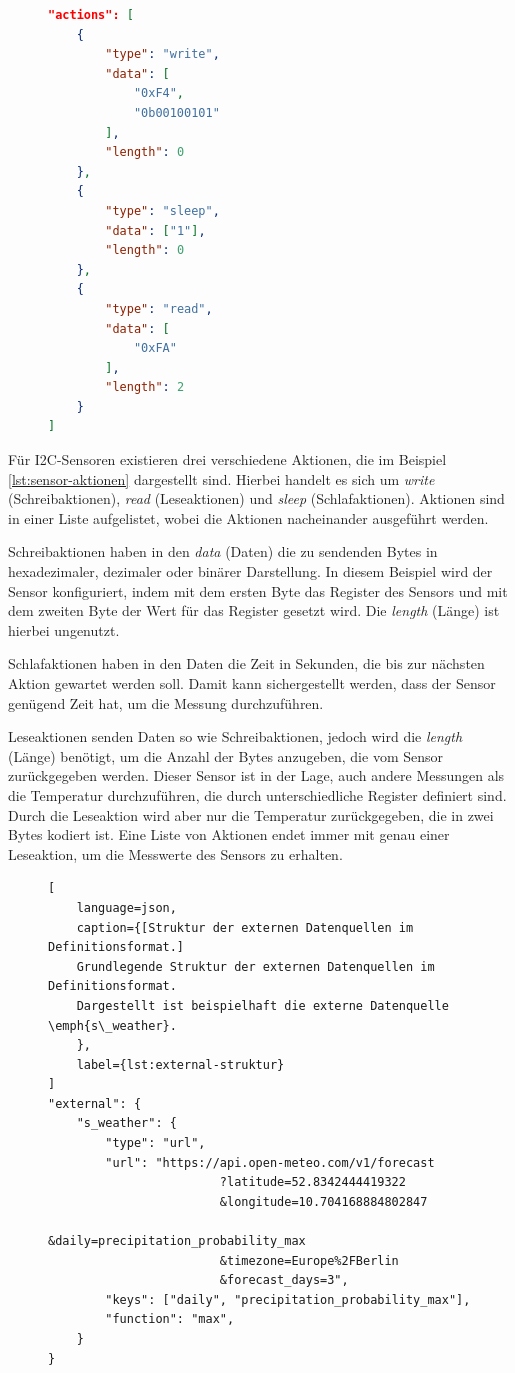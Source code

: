 \begin{figure}[!htb]
\begin{lstlisting}[language=json, caption={[Struktur der Aktionen von Sensoren des Typs I2C im Definitionsformat.]
	Grundlegende Struktur der Aktionen von Sensoren des Typs I2C im Definitionsformat.
	Dargestellt sind beispielhaft die Aktionen für den Sensor \emph{s\_temperature}.
	},
	label={lst:sensor-aktionen}
]
"actions": [
	{
		"type": "write",
		"data": [
			"0xF4",
			"0b00100101"
		],
		"length": 0
	},
	{
		"type": "sleep",
		"data": ["1"],
		"length": 0
	},
	{
		"type": "read",
		"data": [
			"0xFA"
		],
		"length": 2
	}
]
\end{lstlisting}
\end{figure}

Für I2C-Sensoren existieren drei verschiedene Aktionen, die im Beispiel \cref{lst:sensor-aktionen} dargestellt sind.
Hierbei handelt es sich um \emph{write} (Schreibaktionen), \emph{read} (Leseaktionen) und \emph{sleep} (Schlafaktionen).
Aktionen sind in einer Liste aufgelistet, wobei die Aktionen nacheinander ausgeführt werden.

Schreibaktionen haben in den \emph{data} (Daten) die zu sendenden Bytes in hexadezimaler, dezimaler oder binärer Darstellung.
In diesem Beispiel wird der Sensor konfiguriert, indem mit dem ersten Byte das Register des Sensors und mit dem zweiten Byte der Wert für das Register gesetzt wird.
Die \emph{length} (Länge) ist hierbei ungenutzt.

Schlafaktionen haben in den Daten die Zeit in Sekunden, die bis zur nächsten Aktion gewartet werden soll.
Damit kann sichergestellt werden, dass der Sensor genügend Zeit hat, um die Messung durchzuführen.

Leseaktionen senden Daten so wie Schreibaktionen, jedoch wird die \emph{length} (Länge) benötigt, um die Anzahl der Bytes anzugeben, die vom Sensor zurückgegeben werden.
Dieser Sensor ist in der Lage, auch andere Messungen als die Temperatur durchzuführen, die durch unterschiedliche Register definiert sind.
Durch die Leseaktion wird aber nur die Temperatur zurückgegeben, die in zwei Bytes kodiert ist.
Eine Liste von Aktionen endet immer mit genau einer Leseaktion, um die Messwerte des Sensors zu erhalten.

\begin{figure}[!htb]
\begin{lstlisting}[
	language=json,
	caption={[Struktur der externen Datenquellen im Definitionsformat.]
	Grundlegende Struktur der externen Datenquellen im Definitionsformat.
	Dargestellt ist beispielhaft die externe Datenquelle \emph{s\_weather}.
	},
	label={lst:external-struktur}
]
"external": {
	"s_weather": {
		"type": "url",
		"url": "https://api.open-meteo.com/v1/forecast
						?latitude=52.8342444419322
						&longitude=10.704168884802847
						&daily=precipitation_probability_max
						&timezone=Europe%2FBerlin
						&forecast_days=3",
		"keys": ["daily", "precipitation_probability_max"],
		"function": "max",
	}
}
\end{lstlisting}
\end{figure}
	

